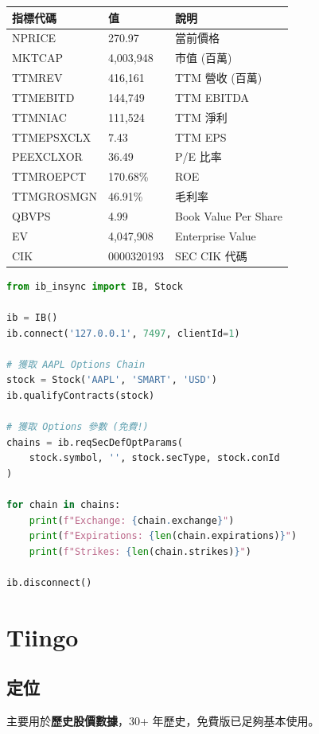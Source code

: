 \documentclass[11pt,a4paper]{article}
\begin{document}
\begin{table}[H]
\centering
\small
\begin{tabular}{@{}llp{5cm}@{}}
\toprule
\textbf{指標代碼} & \textbf{值} & \textbf{說明} \\
\midrule
NPRICE & 270.97 & 當前價格 \\
MKTCAP & 4,003,948 & 市值 (百萬) \\
TTMREV & 416,161 & TTM 營收 (百萬) \\
TTMEBITD & 144,749 & TTM EBITDA \\
TTMNIAC & 111,524 & TTM 淨利 \\
TTMEPSXCLX & 7.43 & TTM EPS \\
PEEXCLXOR & 36.49 & P/E 比率 \\
TTMROEPCT & 170.68\% & ROE \\
TTMGROSMGN & 46.91\% & 毛利率 \\
QBVPS & 4.99 & Book Value Per Share \\
EV & 4,047,908 & Enterprise Value \\
CIK & 0000320193 & SEC CIK 代碼 \\
\bottomrule
\end{tabular}
\end{table}

\begin{lstlisting}[language=Python,caption={獲取 Options Chain}]
from ib_insync import IB, Stock

ib = IB()
ib.connect('127.0.0.1', 7497, clientId=1)

# 獲取 AAPL Options Chain
stock = Stock('AAPL', 'SMART', 'USD')
ib.qualifyContracts(stock)

# 獲取 Options 參數 (免費!)
chains = ib.reqSecDefOptParams(
    stock.symbol, '', stock.secType, stock.conId
)

for chain in chains:
    print(f"Exchange: {chain.exchange}")
    print(f"Expirations: {len(chain.expirations)}")
    print(f"Strikes: {len(chain.strikes)}")

ib.disconnect()
\end{lstlisting}

\newpage
\section{Tiingo}

\subsection{定位}
主要用於\textbf{歷史股價數據}，30+ 年歷史，免費版已足夠基本使用。
\end{document}
